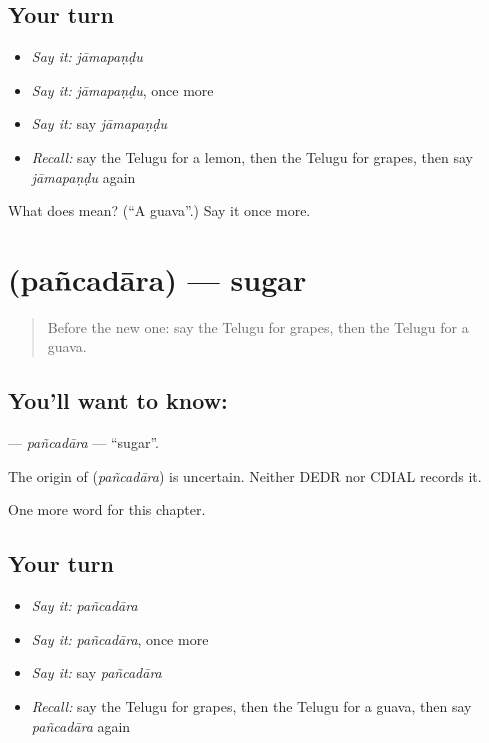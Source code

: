 \subsection*{Your turn}
\begin{itemize}
\raggedright
  \item \emph{Say it:} \emph{jāmapaṇḍu}
  \item \emph{Say it:} \emph{jāmapaṇḍu}, once more
  \item \emph{Say it:} say \emph{jāmapaṇḍu}
  \item \emph{Recall:} say the Telugu for a lemon, then the Telugu for grapes, then say \emph{jāmapaṇḍu} again
\end{itemize}

\begin{tcolorbox}[breakable,colback=teal!4,colframe=teal!35!black,title={Before you move on}]
What does  mean? (\textquotedblleft{}A guava\textquotedblright{}.) Say it once more.
\end{tcolorbox}
\section[\texorpdfstring{\te{పంచదార} (pañcadāra)}{పంచదార (pañcadāra)}]{ (pañcadāra) — sugar}

\label{lesson:TE-C136-pancadara}



\begin{quote}
Before the new one: say the Telugu for grapes, then the Telugu for a guava.
\end{quote}

\subsection*{You'll want to know: }
\textbf{} — \emph{pañcadāra} — \textquotedblleft{}sugar\textquotedblright{}.

\begin{cousinweb}
The origin of \textbf{} (\emph{pañcadāra}) is uncertain. Neither DEDR nor CDIAL records it.
\end{cousinweb}

\begin{grammarlens}[title={What you've built}]
One more word for this chapter.
\end{grammarlens}

\subsection*{Your turn}
\begin{itemize}
\raggedright
  \item \emph{Say it:} \emph{pañcadāra}
  \item \emph{Say it:} \emph{pañcadāra}, once more
  \item \emph{Say it:} say \emph{pañcadāra}
  \item \emph{Recall:} say the Telugu for grapes, then the Telugu for a guava, then say \emph{pañcadāra} again
\end{itemize}

